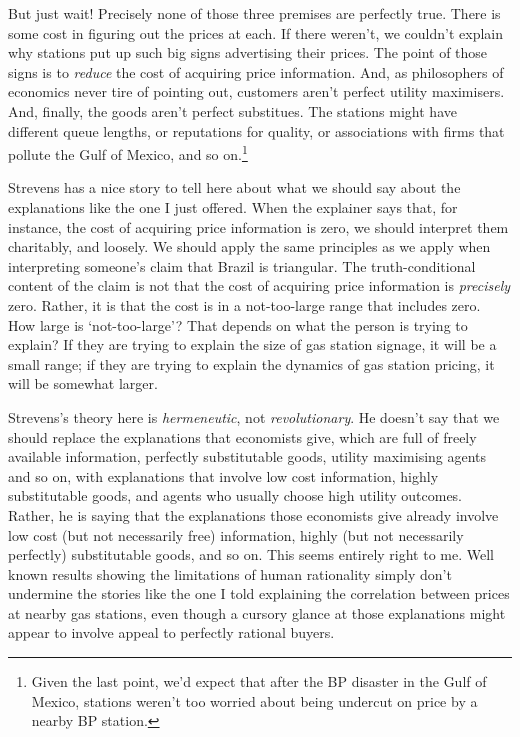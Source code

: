 But just wait! Precisely none of those three premises are perfectly true. There is some cost in figuring out the prices at each. If there weren't, we couldn't explain why stations put up such big signs advertising their prices. The point of those signs is to \textit{reduce} the cost of acquiring price information. And, as philosophers of economics never tire of pointing out, customers aren't perfect utility maximisers. And, finally, the goods aren't perfect substitues. The stations might have different queue lengths, or reputations for quality, or associations with firms that pollute the Gulf of Mexico, and so on.\footnote{Given the last point, we'd expect that after the BP disaster in the Gulf of Mexico, stations weren't too worried about being undercut on price by a nearby BP station.} 

Strevens has a nice story to tell here about what we should say about the explanations like the one I just offered. When the explainer says that, for instance, the cost of acquiring price information is zero, we should interpret them charitably, and loosely. We should apply the same principles as we apply when interpreting someone's claim that Brazil is triangular. The truth-conditional content of the claim is not that the cost of acquiring price information is \textit{precisely} zero. Rather, it is that the cost is in a not-too-large range that includes zero. How large is `not-too-large'? That depends on what the person is trying to explain? If they are trying to explain the size of gas station signage, it will be a small range; if they are trying to explain the dynamics of gas station pricing, it will be somewhat larger.

Strevens's theory here is \textit{hermeneutic}, not \textit{revolutionary}. He doesn't say that we should  replace the explanations that economists give, which are full of freely available information, perfectly substitutable goods, utility maximising agents and so on, with explanations that involve low cost information, highly substitutable goods, and agents who usually choose high utility outcomes. Rather, he is saying that the explanations those economists give already involve low cost (but not necessarily free) information, highly (but not necessarily perfectly) substitutable goods, and so on. This seems entirely right to me. Well known results showing the limitations of human rationality simply don't undermine the stories like the one I told explaining the correlation between prices at nearby gas stations, even though a cursory glance at those explanations might appear to involve appeal to perfectly rational buyers.

